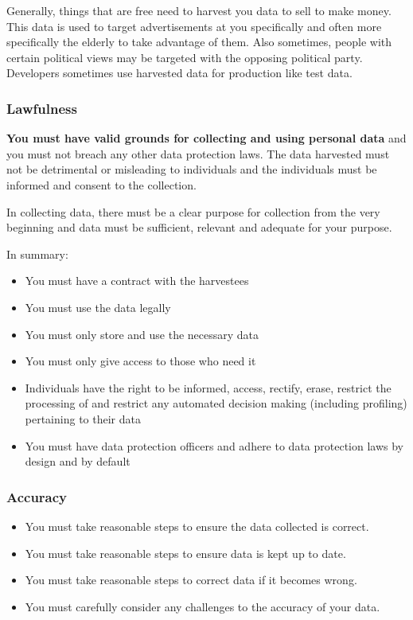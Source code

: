 Generally, things that are free need to harvest you data to sell to make money.
This data is used to target advertisements at you specifically and often more specifically the elderly to take advantage of them.
Also sometimes, people with certain political views may be targeted with the opposing political party.
Developers sometimes use harvested data for production like test data.

\subsubsection{Lawfulness}\label{ssub:lawfulness}

\textbf{You must have valid grounds for collecting and using personal data} and you must not breach any other data protection laws.
The data harvested must not be detrimental or misleading to individuals and the individuals must be informed and consent to the collection.

In collecting data, there must be a clear purpose for collection from the very beginning and data must be sufficient, relevant and adequate for your purpose.

\medskip
\noindent
In summary:

\begin{itemize}
	\item You must have a contract with the harvestees
	\item You must use the data legally
	\item You must only store and use the necessary data
	\item You must only give access to those who need it
	\item Individuals have the right to be informed, access, rectify, erase, restrict the processing of and restrict any automated decision making (including profiling) pertaining to their data
	\item You must have data protection officers and adhere to data protection laws by design and by default
\end{itemize}

\subsubsection{Accuracy}\label{ssub:acuracy}

\begin{itemize}
	\item You must take reasonable steps to ensure the data collected is correct.
	\item You must take reasonable steps to ensure data is kept up to date.
	\item You must take reasonable steps to correct data if it becomes wrong.
	\item You must carefully consider any challenges to the accuracy of your data.
\end{itemize}

